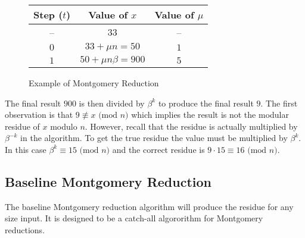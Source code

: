 \documentclass[b5paper]{book}
\def\nequiv{\not\equiv}
\begin{document}
\newpage\begin{figure}
\begin{center}
\begin{tabular}{|c|c|c|}
\hline \textbf{Step ($t$)} & \textbf{Value of $x$} & \textbf{Value of $\mu$} \\
\hline --                 & $33$ & --\\
\hline $0$                 & $33 + \mu n = 50$ & $1$ \\
\hline $1$                 & $50 + \mu n \beta = 900$ & $5$ \\
\hline
\end{tabular}
\end{center}
\caption{Example of Montgomery Reduction}
\end{figure}

The final result $900$ is then divided by $\beta^k$ to produce the final result $9$.  The first observation is that $9 \nequiv x \mbox{ (mod }n\mbox{)}$ 
which implies the result is not the modular residue of $x$ modulo $n$.  However, recall that the residue is actually multiplied by $\beta^{-k}$ in
the algorithm.  To get the true residue the value must be multiplied by $\beta^k$.  In this case $\beta^k \equiv 15 \mbox{ (mod }n\mbox{)}$ and
the correct residue is $9 \cdot 15 \equiv 16 \mbox{ (mod }n\mbox{)}$.  

\subsection{Baseline Montgomery Reduction}
The baseline Montgomery reduction algorithm will produce the residue for any size input.  It is designed to be a catch-all algororithm for 
Montgomery reductions.  
\end{document}
